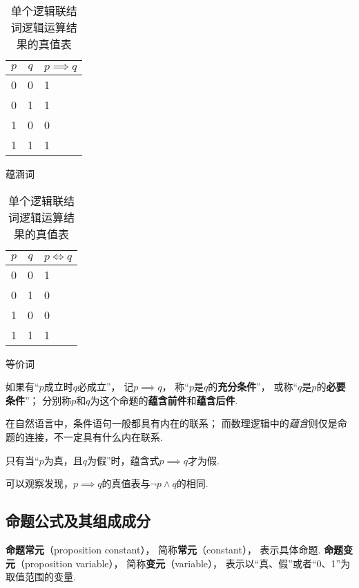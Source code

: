 \begin{table}[ht]
\begin{subtable}[ht]{0.45\textwidth}
\centering
\begin{tabular}{|*{2}{c|}p{2cm}|}
\hline
\(p\) & \(q\) & \(p \implies q\) \\ \hline
0 & 0 & 1 \\ \hline
0 & 1 & 1 \\ \hline
1 & 0 & 0 \\ \hline
1 & 1 & 1 \\ \hline
\end{tabular}
\caption{蕴涵词}
\end{subtable}
\begin{subtable}[ht]{0.45\textwidth}
\centering
\begin{tabular}{|*{2}{c|}p{2cm}|}
\hline
\(p\) & \(q\) & \(p \iff q\) \\ \hline
0 & 0 & 1 \\ \hline
0 & 1 & 0 \\ \hline
1 & 0 & 0 \\ \hline
1 & 1 & 1 \\ \hline
\end{tabular}
\caption{等价词}
\end{subtable}

\caption{单个逻辑联结词逻辑运算结果的真值表}
\end{table}
    
\begin{definition}
如果有“\(p\)成立时\(q\)必成立”，%
记\(p \implies q\)，%
称“\(p\)是\(q\)的\textbf{充分条件}”，%
或称“\(q\)是\(p\)的\textbf{必要条件}”；
分别称\(p\)和\(q\)为这个命题的\textbf{蕴含前件}和\textbf{蕴含后件}.
\end{definition}

在自然语言中，条件语句一般都具有内在的联系；
而数理逻辑中的\emph{蕴含}则仅是命题的连接，不一定具有什么内在联系.

\begin{property}
只有当“\(p\)为真，且\(q\)为假”时，蕴含式\(p \implies q\)才为假.
\end{property}
可以观察发现，\(p \implies q\)的真值表与\(\neg p \land q\)的相同.

\subsection{命题公式及其组成成分}
\begin{definition}
\textbf{命题常元}（proposition constant），%
简称\textbf{常元}（constant），%
表示具体命题.
\textbf{命题变元}（proposition variable），%
简称\textbf{变元}（variable），%
表示以“真、假”或者“0、1”为取值范围的变量.
\end{definition}

